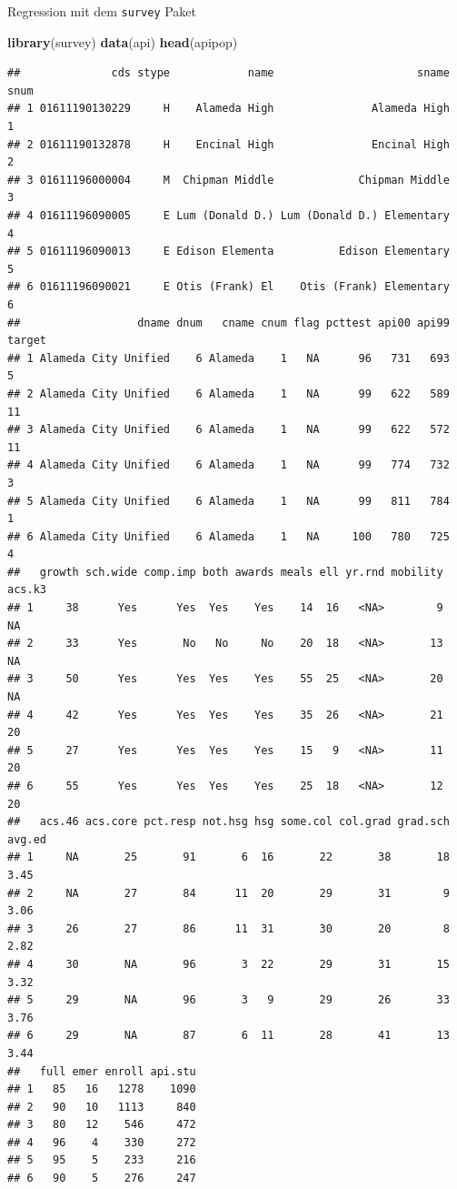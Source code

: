 \documentclass[ignorenonframetext,]{beamer}
\newenvironment{Shaded}{}{}
\newcommand{\KeywordTok}[1]{\textcolor[rgb]{0.00,0.44,0.13}{\textbf{{#1}}}}
\newcommand{\NormalTok}[1]{{#1}}
\begin{document}
\begin{frame}[fragile]{Regression mit dem \texttt{survey} Paket}

\begin{Shaded}
\begin{Highlighting}[]
\KeywordTok{library}\NormalTok{(survey)}
\KeywordTok{data}\NormalTok{(api)}
\KeywordTok{head}\NormalTok{(apipop)}
\end{Highlighting}
\end{Shaded}

\begin{verbatim}
##              cds stype            name                      sname snum
## 1 01611190130229     H    Alameda High               Alameda High    1
## 2 01611190132878     H    Encinal High               Encinal High    2
## 3 01611196000004     M  Chipman Middle             Chipman Middle    3
## 4 01611196090005     E Lum (Donald D.) Lum (Donald D.) Elementary    4
## 5 01611196090013     E Edison Elementa          Edison Elementary    5
## 6 01611196090021     E Otis (Frank) El    Otis (Frank) Elementary    6
##                  dname dnum   cname cnum flag pcttest api00 api99 target
## 1 Alameda City Unified    6 Alameda    1   NA      96   731   693      5
## 2 Alameda City Unified    6 Alameda    1   NA      99   622   589     11
## 3 Alameda City Unified    6 Alameda    1   NA      99   622   572     11
## 4 Alameda City Unified    6 Alameda    1   NA      99   774   732      3
## 5 Alameda City Unified    6 Alameda    1   NA      99   811   784      1
## 6 Alameda City Unified    6 Alameda    1   NA     100   780   725      4
##   growth sch.wide comp.imp both awards meals ell yr.rnd mobility acs.k3
## 1     38      Yes      Yes  Yes    Yes    14  16   <NA>        9     NA
## 2     33      Yes       No   No     No    20  18   <NA>       13     NA
## 3     50      Yes      Yes  Yes    Yes    55  25   <NA>       20     NA
## 4     42      Yes      Yes  Yes    Yes    35  26   <NA>       21     20
## 5     27      Yes      Yes  Yes    Yes    15   9   <NA>       11     20
## 6     55      Yes      Yes  Yes    Yes    25  18   <NA>       12     20
##   acs.46 acs.core pct.resp not.hsg hsg some.col col.grad grad.sch avg.ed
## 1     NA       25       91       6  16       22       38       18   3.45
## 2     NA       27       84      11  20       29       31        9   3.06
## 3     26       27       86      11  31       30       20        8   2.82
## 4     30       NA       96       3  22       29       31       15   3.32
## 5     29       NA       96       3   9       29       26       33   3.76
## 6     29       NA       87       6  11       28       41       13   3.44
##   full emer enroll api.stu
## 1   85   16   1278    1090
## 2   90   10   1113     840
## 3   80   12    546     472
## 4   96    4    330     272
## 5   95    5    233     216
## 6   90    5    276     247
\end{verbatim}

\end{frame}
\end{document}
